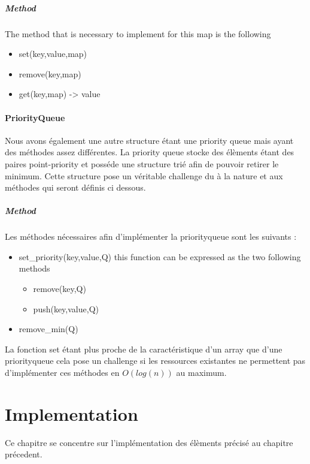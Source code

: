 \documentclass[twoside,12pt, a4paper]{report}
\begin{document}
\paragraph{Method}
The method that is necessary to implement for this map is the following

\begin{itemize}
	\item set(key,value,map)
	\item remove(key,map)
	\item get(key,map) -> value
\end{itemize}

\subsubsection{PriorityQueue}

Nous avons également une autre structure étant une priority queue mais ayant des méthodes assez différentes. La priority queue stocke des élèments étant des paires point-priority et posséde une structure trié afin de pouvoir retirer le minimum. Cette structure pose un véritable challenge du à la nature et aux méthodes qui seront définis ci dessous. 

\paragraph{Method}
Les méthodes nécessaires afin d'implémenter la priorityqueue sont les suivants :

\begin{itemize}
	\item set\_priority(key,value,Q) this function can be expressed as the two following methods
	\begin{itemize}
		\item remove(key,Q)
		\item push(key,value,Q)
	\end{itemize}
	\item remove\_min(Q)
\end{itemize}

La fonction set étant plus proche de la caractéristique d'un array que d'une priorityqueue cela pose un challenge si les ressources existantes ne permettent pas d'implémenter ces méthodes en $O(log(n))$ au maximum. 



\chapter{Implementation}
Ce chapitre se concentre sur l'implémentation des élèments précisé au chapitre précedent.
\end{document}
